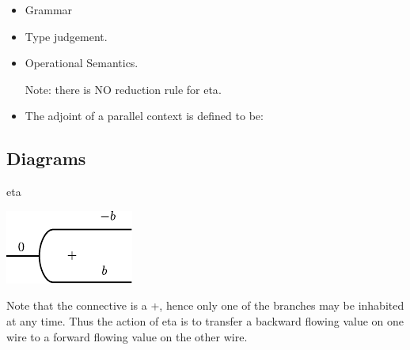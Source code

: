 \documentclass[preprint]{sigplanconf}
\begin{document}
\begin{itemize}
\item Grammar

\item
Type judgement.


\item
Operational Semantics.

Note: there is NO reduction rule for {{eta}}. 

\item
The adjoint of a parallel context is defined to be:

\end{itemize}

\subsection{Diagrams}

{{eta}}

\begin{center}
  \includegraphics{diagrams/eta.pdf}
\end{center}

Note that the connective is a {{+}}, hence only one of the branches
may be inhabited at any time. Thus the action of {{eta}} is to
transfer a backward flowing value on one wire to a forward flowing
value on the other wire.
\end{document}
